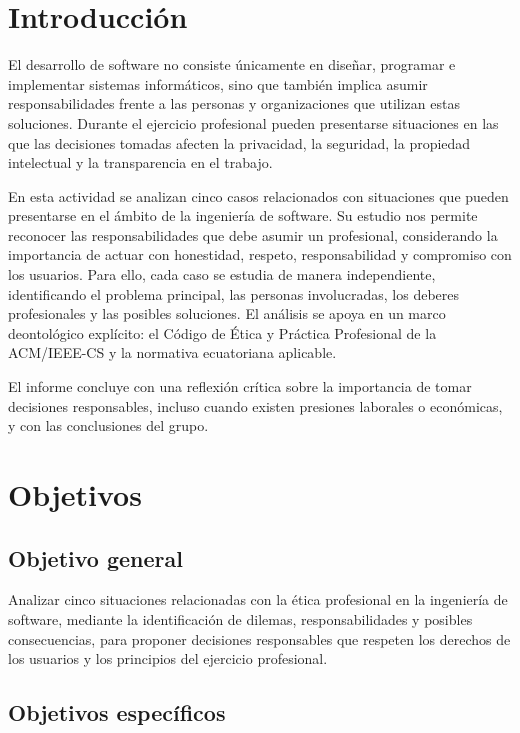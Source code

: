 \documentclass[12pt,a4paper,oneside]{article}
\begin{document}
\section{Introducción}

El desarrollo de software no consiste únicamente en diseñar, programar e implementar sistemas informáticos, sino que también implica asumir responsabilidades frente a las personas y organizaciones que utilizan estas soluciones. Durante el ejercicio profesional pueden presentarse situaciones en las que las decisiones tomadas afecten la privacidad, la seguridad, la propiedad intelectual y la transparencia en el trabajo.

En esta actividad se analizan cinco casos relacionados con situaciones que pueden presentarse en el ámbito de la ingeniería de software. Su estudio nos permite reconocer las responsabilidades que debe asumir un profesional, considerando la importancia de actuar con honestidad, respeto, responsabilidad y compromiso con los usuarios. Para ello, cada caso se estudia de manera independiente, identificando el problema principal, las personas involucradas, los deberes profesionales y las posibles soluciones. El análisis se apoya en un marco deontológico explícito: el Código de Ética y Práctica Profesional de la ACM/IEEE-CS y la normativa ecuatoriana aplicable.

El informe concluye con una reflexión crítica sobre la importancia de tomar decisiones responsables, incluso cuando existen presiones laborales o económicas, y con las conclusiones del grupo.

\section{Objetivos}

\subsection{Objetivo general}

Analizar cinco situaciones relacionadas con la ética profesional en la ingeniería de software, mediante la identificación de dilemas, responsabilidades y posibles consecuencias, para proponer decisiones responsables que respeten los derechos de los usuarios y los principios del ejercicio profesional.

\subsection{Objetivos específicos}
\end{document}
